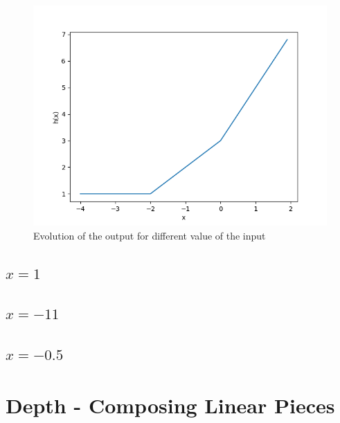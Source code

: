 \documentclass[11pt,english]{article}
\begin{document}
\begin{figure}[h!]
    \begin{center}
        \includegraphics[width=0.5\linewidth]{../3_piecewise_linearity/curve.png}
        \caption{Evolution of the output for different value of the input}
    \end{center}
\end{figure}

    \subsection{$x=1$}
    
 \subsection{$x=-11$}

 \subsection{$x=-0.5$}


 \section{Depth - Composing Linear Pieces}



 
\end{document}
